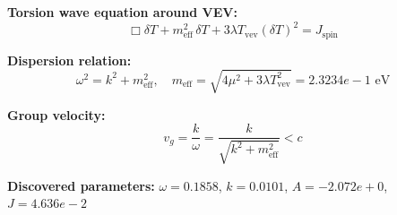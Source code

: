 
\textbf{Torsion wave equation around VEV:}
\begin{equation}
  \Box \delta T + m_{\text{eff}}^2 \, \delta T + 3\lambda T_{\text{vev}} (\delta T)^2 = J_{\text{spin}}
\end{equation}

\textbf{Dispersion relation:}
\begin{equation}
  \omega^2 = k^2 + m_{\text{eff}}^2, \quad
  m_{\text{eff}} = \sqrt{4\mu^2 + 3\lambda T_{\text{vev}}^2} = 2.3234e-1 \text{ eV}
\end{equation}

\textbf{Group velocity:}
\begin{equation}
  v_g = \frac{k}{\omega} = \frac{k}{\sqrt{k^2 + m_{\text{eff}}^2}} < c
\end{equation}

\textbf{Discovered parameters:}
$\omega = 0.1858$, \quad
$k = 0.0101$, \quad
$A = -2.072e+0$, \quad
$J = 4.636e-2$